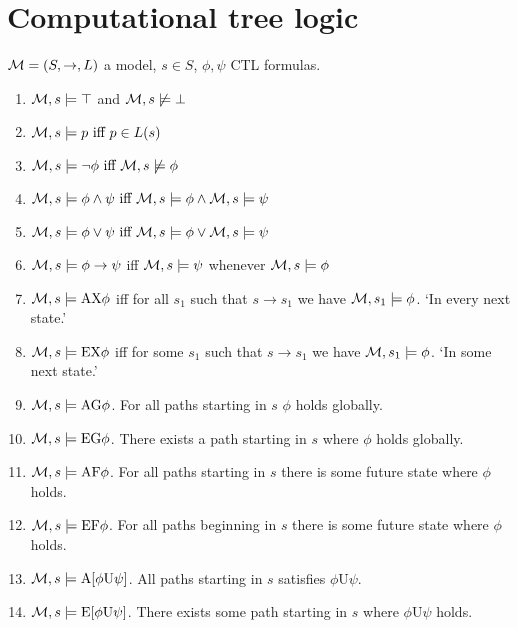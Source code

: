 \documentclass[10pt,a4paper]{article}
\begin{document}
\section*{Computational tree logic}

$\mathcal{M} = (S, \to, L)$ a model, $s \in S$, $\phi, \psi$ CTL formulas.

\begin{enumerate}
  \item $\mathcal{M}, s \models \top$ and $\mathcal{M}, s \not\models \bot$
  \item $\mathcal{M}, s \models p \text{ iff } p \in L(s)$
  \item $\mathcal{M}, s \models \neg \phi \text{ iff } \mathcal{M}, s \not\models \phi$
  \item $\mathcal{M}, s \models \phi \land \psi \text{ iff } \mathcal{M}, s \models \phi \land \mathcal{M}, s \models \psi$
  \item $\mathcal{M}, s \models \phi \lor \psi \text{ iff } \mathcal{M}, s \models \phi \lor \mathcal{M}, s \models \psi$
  \item $\mathcal{M}, s \models \phi \to \psi$ iff $\mathcal{M}, s \models \psi$ whenever $\mathcal{M}, s \models \phi$
  \item $\mathcal{M}, s \models \text{AX} \phi$ iff for all $s_1$ such that $s \to s_1$ we have $\mathcal{M}, s_1 \models \phi$. `In every next state.'
  \item $\mathcal{M}, s \models \text{EX} \phi$ iff for some $s_1$ such that $s \to s_1$ we have $\mathcal{M}, s_1 \models \phi$. `In some next state.'
  \item $\mathcal{M}, s \models \text{AG} \phi$. For all paths starting in $s$ $\phi$ holds globally.
  \item $\mathcal{M}, s \models \text{EG} \phi$. There exists a path starting in $s$ where $\phi$ holds globally.
  \item $\mathcal{M}, s \models \text{AF} \phi$. For all paths starting in $s$ there is some future state where $\phi$ holds.
  \item $\mathcal{M}, s \models \text{EF} \phi$. For all paths beginning in $s$ there is some future state where $\phi$ holds.
  \item $\mathcal{M}, s \models \text{A}[\phi \text{U} \psi]$. All paths starting in $s$ satisfies $\phi \text{U} \psi$.
  \item $\mathcal{M}, s \models \text{E}[\phi \text{U} \psi]$. There exists some path starting in $s$ where $\phi \text{U} \psi$ holds.
\end{enumerate}
\end{document}
